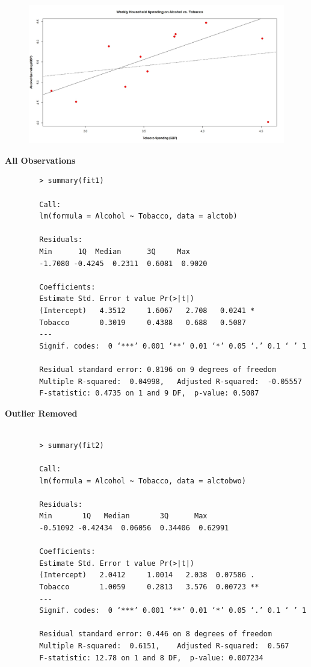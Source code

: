 \documentclass[residuals.tex]{subfiles}
\begin{document}
	\begin{figure}
		\centering
		\includegraphics[width=1.3\linewidth]{alcotob2}
		\caption{}
		\label{fig:alcotob}
	\end{figure}
	\bigskip	
	\begin{framed}	
		\textbf{All Observations}	
		\begin{verbatim}
		> summary(fit1)
		
		Call:
		lm(formula = Alcohol ~ Tobacco, data = alctob)
		
		Residuals:
		Min      1Q  Median      3Q     Max 
		-1.7080 -0.4245  0.2311  0.6081  0.9020 
		
		Coefficients:
		Estimate Std. Error t value Pr(>|t|)  
		(Intercept)   4.3512     1.6067   2.708   0.0241 *
		Tobacco       0.3019     0.4388   0.688   0.5087  
		---
		Signif. codes:  0 ‘***’ 0.001 ‘**’ 0.01 ‘*’ 0.05 ‘.’ 0.1 ‘ ’ 1
		
		Residual standard error: 0.8196 on 9 degrees of freedom
		Multiple R-squared:  0.04998,   Adjusted R-squared:  -0.05557 
		F-statistic: 0.4735 on 1 and 9 DF,  p-value: 0.5087
		\end{verbatim}
	\end{framed}
	
	\begin{framed}
		\textbf{Outlier Removed	}
		\begin{verbatim}
		
		> summary(fit2)
		
		Call:
		lm(formula = Alcohol ~ Tobacco, data = alctobwo)
		
		Residuals:
		Min       1Q   Median       3Q      Max 
		-0.51092 -0.42434  0.06056  0.34406  0.62991 
		
		Coefficients:
		Estimate Std. Error t value Pr(>|t|)   
		(Intercept)   2.0412     1.0014   2.038  0.07586 . 
		Tobacco       1.0059     0.2813   3.576  0.00723 **
		---
		Signif. codes:  0 ‘***’ 0.001 ‘**’ 0.01 ‘*’ 0.05 ‘.’ 0.1 ‘ ’ 1
		
		Residual standard error: 0.446 on 8 degrees of freedom
		Multiple R-squared:  0.6151,    Adjusted R-squared:  0.567 
		F-statistic: 12.78 on 1 and 8 DF,  p-value: 0.007234
		
		\end{verbatim}
	\end{framed}
	
\end{document}
